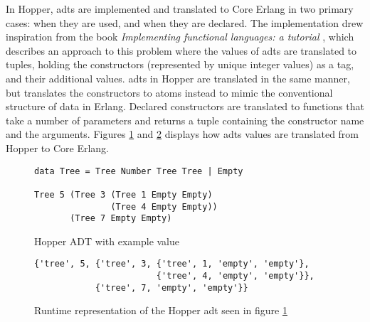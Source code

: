 In Hopper, \glspl{adt} are implemented and translated to Core Erlang in two primary cases: when they are used, and when they are declared. The implementation drew inspiration from the book \textit{Implementing functional languages: a tutorial} \cite{FunTutorial}, which describes an approach to this problem where the values of \glspl{adt} are translated to tuples, holding the constructors (represented by unique integer values) as a tag, and their additional values. \Glspl{adt} in Hopper are translated in the same manner, but translates the constructors to atoms instead to mimic the conventional structure of data in Erlang. Declared constructors are translated to functions that take a number of parameters and returns a tuple containing the constructor name and the arguments. Figures \ref{lst:hopperAdt} and \ref{lst:coreAdt} displays how \glspl{adt} values are translated from Hopper to Core Erlang.

\begin{figure}[!htb]
\centering
\begin{lstlisting} 
data Tree = Tree Number Tree Tree | Empty

Tree 5 (Tree 3 (Tree 1 Empty Empty) 
               (Tree 4 Empty Empty)) 
       (Tree 7 Empty Empty)
\end{lstlisting}
\caption{Hopper ADT with example value}
\label{lst:hopperAdt}
\end{figure}

\begin{figure}[!htb]
\centering
\begin{lstlisting} 
{'tree', 5, {'tree', 3, {'tree', 1, 'empty', 'empty'},
                        {'tree', 4, 'empty', 'empty'}},
            {'tree', 7, 'empty', 'empty'}}
\end{lstlisting}
\caption[Runtime representation of an \gls{adt} value]
 {Runtime representation of the Hopper \gls{adt} seen in figure \ref{lst:hopperAdt}}
\label{lst:coreAdt}
\end{figure}





